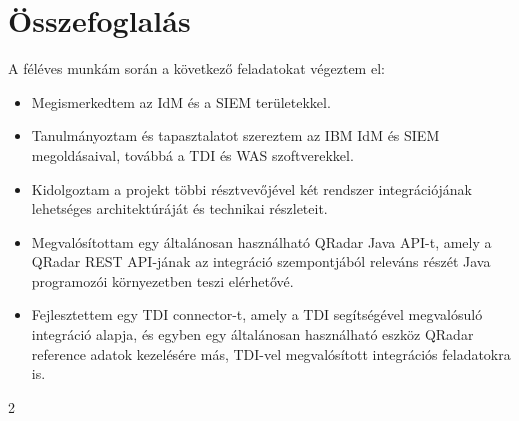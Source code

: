 \chapter{Összefoglalás}
\label{ch:sum}
A féléves munkám során a következő feladatokat végeztem el:

\begin{itemize}
	\item Megismerkedtem az IdM és a SIEM területekkel.
	\item Tanulmányoztam és tapasztalatot szereztem az IBM IdM és SIEM megoldásaival, továbbá a TDI és WAS szoftverekkel.
	\item Kidolgoztam a projekt többi résztvevőjével két rendszer integrációjának lehetséges architektúráját és technikai részleteit.
	\item Megvalósítottam egy általánosan használható QRadar Java API-t, amely a QRadar REST API-jának az integráció szempontjából releváns részét Java programozói környezetben teszi elérhetővé.
	\item Fejlesztettem egy TDI connector-t, amely a TDI segítségével megvalósuló integráció alapja, és egyben egy általánosan használható eszköz QRadar reference adatok kezelésére más, TDI-vel megvalósított integrációs feladatokra is.
\end{itemize}
2